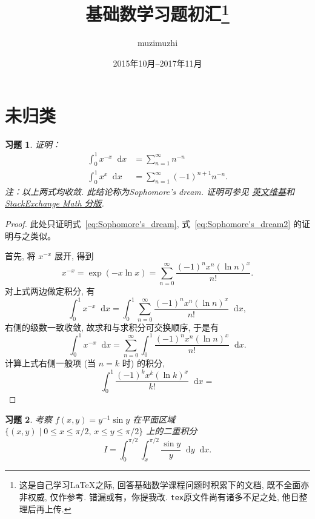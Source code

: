 \documentclass{ctexart}
\title{基础数学习题初汇\thanks{这是自己学习\LaTeX 之际, 回答基础数学课程问题时积累下的文档, 既不全面亦非权威, 仅作参考. 错漏或有，你提我改. \texttt{tex}原文件尚有诸多不足之处, 他日整理后再上传. %
            }}
\author{muzimuzhi}
\date{2015年10月--2017年11月}
\renewcommand\dif{\mathop{}\!\mathrm{d}}
\newcommand{\dx}{\ensuremath{\dif x}}
\theoremstyle{plain}
\newtheorem{exercise}{习题}[subsection]
\theoremstyle{definition}
\begin{document}
\maketitle
\tableofcontents
\newpage







\section{未归类}
\begin{exercise}
    证明：
    \begin{align}
    \int_0^1 x^{-x} \dx &= \sum_{n = 1}^{\infty} n^{-n} \label{eq:Sophomore's_dream}\\
    \int_0^1 x^x \dx &= \sum_{n = 1}^{\infty} (-1)^{n+1} n^{-n}. \label{eq:Sophomore's_dream2}
    \end{align}
    \emph{注：以上两式均收敛. 此结论称为Sophomore's dream. 证明可参见%
        \href{https://en.wikipedia.org/wiki/Sophomore\%27s_dream}{英文维基}和 %
        \href{http://math.stackexchange.com/questions/237513/series-as-an-integral-sophomores-dream}{StackExchange Math 分版}.}
\end{exercise}

\begin{proof}
    此处只证明式~\eqref{eq:Sophomore's_dream}, 式~\eqref{eq:Sophomore's_dream2} 的证明与之类似。
    
    首先, 将 $x^{-x}$ 展开, 得到
    \begin{equation*}
    x^{-x} = \exp(-x \ln x) = \sum_{n = 0}^{\infty} \frac{(-1)^n x^n (\ln n)^x}{n!}.
    \end{equation*}
    对上式两边做定积分, 有
    \begin{equation*}
    \int_0^1 x^{-x} \dx 
    = \int_0^1 \sum_{n = 0}^{\infty} \frac{(-1)^n x^n (\ln n)^x}{n!} \dx,
    \end{equation*}
    右侧的级数一致收敛, 故求和与求积分可交换顺序, 于是有
    \begin{equation*}
    \int_0^1 x^{-x} \dx 
    = \sum_{n = 0}^{\infty} \int_0^1 \frac{(-1)^n x^n (\ln n)^x}{n!} \dx.
    \end{equation*}
    计算上式右侧一般项 (当 $n = k$ 时) 的积分, 
    \[
    \int_0^1 \frac{(-1)^k x^k (\ln k)^x}{k!} \dx
    = 
    \]
\end{proof}

\begin{exercise}
    考察 $f(x, y) = y^{-1} \sin y$ 在平面区域 $\{ (x, y) \mid 0 \le x \le \pi/2,\, x \le y \le \pi / 2 \}$ 上的二重积分
    \[
    I= \int_0^{\pi / 2} \int_x^{\pi / 2} \frac{\sin y}{y} \dif y \dx.
    \]
\end{exercise}
\end{document}
